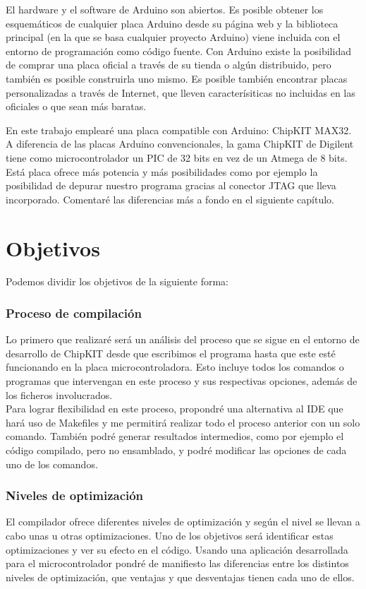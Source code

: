 El hardware y el software de Arduino son abiertos.  Es posible obtener los esquemáticos de cualquier placa Arduino desde su página web y la biblioteca principal (en la que se basa cualquier proyecto Arduino) viene incluida con el entorno de programación como código fuente.  Con Arduino existe la posibilidad de comprar una placa oficial a través de su tienda o algún distribuido, pero también es posible construirla uno mismo.  Es posible también encontrar placas personalizadas a través de Internet, que lleven caracterísiticas no incluidas en las oficiales o que sean más baratas.

En este trabajo emplearé una placa compatible con Arduino: ChipKIT MAX32.  A diferencia de las placas Arduino convencionales, la gama ChipKIT de Digilent tiene como microcontrolador un PIC de 32 bits en vez de un Atmega de 8 bits.  Está placa ofrece más potencia y más posibilidades como por ejemplo la posibilidad de depurar nuestro programa gracias al conector JTAG que lleva incorporado. Comentaré las diferencias más a fondo en el siguiente capítulo.

\section{Objetivos}
Podemos dividir los objetivos de la siguiente forma:

\subsubsection{Proceso de compilación}
Lo primero que realizaré será un análisis del proceso que se sigue en el entorno de desarrollo de ChipKIT desde que escribimos el programa hasta que este esté funcionando en la placa microcontroladora.  Esto incluye todos los comandos o programas que intervengan en este proceso y sus respectivas opciones, además de los ficheros involucrados.\\
Para lograr flexibilidad en este proceso, propondré una alternativa al IDE que hará uso de Makefiles y me permitirá realizar todo el proceso anterior con un solo comando. También podré generar resultados intermedios, como por ejemplo el código compilado, pero no ensamblado, y podré modificar las opciones de cada uno de los comandos.

\subsubsection{Niveles de optimización}
El compilador ofrece diferentes niveles de optimización y según el nivel se llevan a cabo unas u otras optimizaciones. Uno de los objetivos será identificar estas optimizaciones y ver su efecto en el código. Usando una aplicación desarrollada para el microcontrolador pondré de manifiesto las diferencias entre los distintos niveles de optimización, que ventajas y que desventajas tienen cada uno de ellos.

